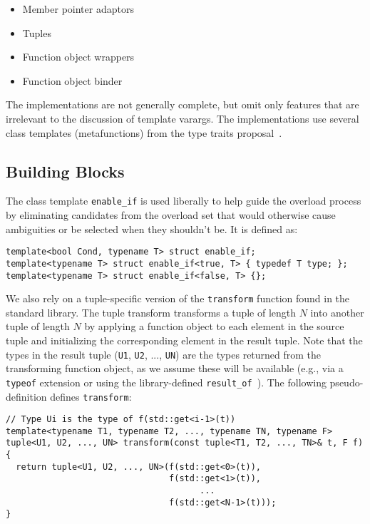 \documentclass{article}
\begin{document}
\begin{itemize}
\item Member pointer adaptors~\cite{Dimov03a}
\item Tuples~\cite{Jarvi02}
\item Function object wrappers~\cite{Gregor02}
\item Function object binder~\cite{Dimov03b}
\end{itemize}

The implementations are not generally complete, but omit only features
that are irrelevant to the discussion of template varargs. The
implementations use several class templates (metafunctions) from the
type traits proposal~\cite{Maddock03}.

\subsection{Building Blocks}
\label{building_blocks}
The class template {\tt enable\_if} is used liberally to help guide
the overload process by eliminating candidates from the overload set
that would otherwise cause ambiguities or be selected when they
shouldn't be. It is defined as:

\begin{verbatim}
template<bool Cond, typename T> struct enable_if;
template<typename T> struct enable_if<true, T> { typedef T type; };
template<typename T> struct enable_if<false, T> {};
\end{verbatim}

We also rely on a tuple-specific version of the {\tt transform}
function found in the standard library. The tuple transform transforms
a tuple of length $N$ into another tuple of length $N$ by applying a
function object to each element in the source tuple and initializing
the corresponding element in the result tuple. Note that the types in
the result tuple ({\tt U1}, {\tt U2}, ..., {\tt UN}) are the types
returned from the transforming function object, as we assume these
will be available (e.g., via a {\tt typeof} extension or using the
library-defined {\tt result\_of}~\cite{Gregor03}). The following
pseudo-definition defines {\tt transform}:
\begin{verbatim}
// Type Ui is the type of f(std::get<i-1>(t))
template<typename T1, typename T2, ..., typename TN, typename F>
tuple<U1, U2, ..., UN> transform(const tuple<T1, T2, ..., TN>& t, F f)
{ 
  return tuple<U1, U2, ..., UN>(f(std::get<0>(t)), 
                                f(std::get<1>(t)),
                                      ...
                                f(std::get<N-1>(t)));
}
\end{verbatim}
\end{document}
